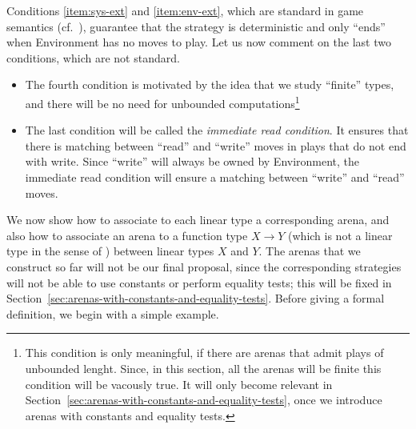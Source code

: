 \documentclass[a4paper,UKenglish,cleveref, autoref, numberwithinsect, thm-restate]{lipics-v2021}
\begin{document}
Conditions \ref{item:sys-ext} and \ref{item:env-ext}, which are standard in game semantics (cf.~\cite[p.~5]{abramsky2013semantics}),  guarantee that the strategy is deterministic and only ``ends'' when 
Environment has no moves to play.  Let us now comment on the last two conditions, which are not standard.
\begin{itemize}
    \item The fourth condition is motivated by the idea that we study ``finite'' types,  and there will be no need for unbounded computations\footnote{This condition is only meaningful, if there 
          are arenas that admit plays of unbounded lenght. Since, in this section, all the arenas will be finite this condition will be vacously true. It will only become relevant in 
            Section~\ref{sec:arenas-with-constants-and-equality-tests}, once we introduce arenas with constants and equality tests.}
    \item The last condition will be called the  \emph{immediate read condition}. It ensures that there is matching between ``read'' and ``write'' moves in plays that do not end with write. Since ``write'' will always be owned by Environment, the immediate read condition will ensure a matching between ``write'' and ``read'' moves.
\end{itemize}
We now show how to associate to each linear type a corresponding arena, and also how to associate an arena to a function type $X \to Y$ (which is not a linear type in the sense of ) between linear types $X$ and $Y$. The arenas that we construct so far will not be our final proposal, since the corresponding strategies will not be able to use constants or perform equality tests; this will be fixed in Section~\ref{sec:arenas-with-constants-and-equality-tests}. Before giving a formal definition, we begin with a simple example.
\end{document}
